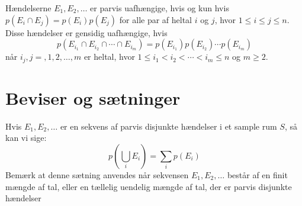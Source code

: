 \begin{frdef}[S. 444, 5]
Hændelserne $E_1,E_2,\dots$ er parvis uafhængige, hvis og kun hvis $p(E_i\cap E_j)=p(E_i)p(E_j)$ for alle par af heltal $i$ og $j$, hvor $1\leq i\leq j\leq n$. \\
Disse hændelser er gensidig uafhængige, hvis 
\begin{equation}
p(E_{i_1}\cap E_{i_2}\cap \cdots \cap E_{i_m})=p(E_{i_1})p(E_{i_2})\cdots p(E_{i_m})
\end{equation}
når $i_j,j=,1,2,\dots,m$ er heltal, hvor $1\leq i_1< i_2<\cdots<i_m\leq n$ og $m\geq 2$.
\end{frdef}


\section{Beviser og sætninger}

\begin{frtheo}[S. 441, 1]
Hvis $E_1,E_2, \dots$ er en sekvens af parvis disjunkte hændelser i et sample rum $S$, så kan vi sige:
\begin{equation}
p\left(\bigcup_{i}E_i\right)=\sum_ip(E_i)
\end{equation}
Bemærk at denne sætning anvendes når sekvensen $E_1,E_2,\dots$ består af en finit mængde af tal, eller en tællelig uendelig mængde af tal, der er parvis disjunkte hændelser
\end{frtheo}